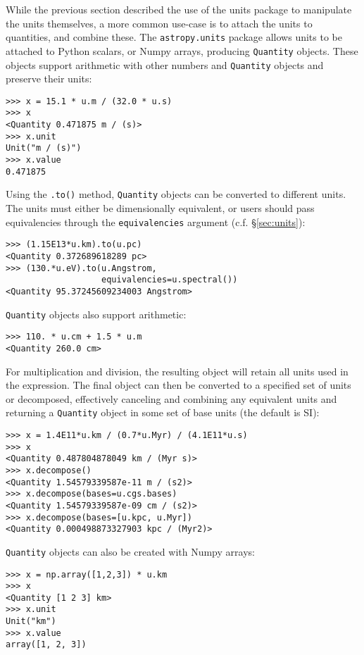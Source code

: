 \documentclass[traditabstract]{aa}
\begin{document}
\label{sec:quantities}

While the previous section described the use of the units package to
manipulate the units themselves, a more common use-case is to attach the units
to quantities, and combine these. The \texttt{astropy.units} package allows
units to be attached to Python scalars, or Numpy arrays, producing
\texttt{Quantity} objects. These objects support arithmetic with other numbers
and \texttt{Quantity} objects and preserve their units:
\begin{verbatim}
>>> x = 15.1 * u.m / (32.0 * u.s)
>>> x
<Quantity 0.471875 m / (s)>
>>> x.unit
Unit("m / (s)")
>>> x.value
0.471875
\end{verbatim}

Using the \texttt{.to()} method, \texttt{Quantity} objects can be
converted to different units. The units must either be dimensionally
equivalent, or users should pass equivalencies through the
\texttt{equivalencies} argument (c.f. \S\ref{sec:units}):
\begin{verbatim}
>>> (1.15E13*u.km).to(u.pc)
<Quantity 0.372689618289 pc>
>>> (130.*u.eV).to(u.Angstrom,
                   equivalencies=u.spectral())
<Quantity 95.37245609234003 Angstrom>
\end{verbatim}

\texttt{Quantity} objects also support arithmetic:
\begin{verbatim}
>>> 110. * u.cm + 1.5 * u.m
<Quantity 260.0 cm>
\end{verbatim}

For multiplication and division, the resulting object will retain all
units used in the expression. The final object can then be converted
to a specified set of units or decomposed, effectively canceling
and combining any equivalent units and returning a \texttt{Quantity}
object in some set of base units (the default is SI):

\begin{verbatim}
>>> x = 1.4E11*u.km / (0.7*u.Myr) / (4.1E11*u.s)
>>> x
<Quantity 0.487804878049 km / (Myr s)>
>>> x.decompose()
<Quantity 1.54579339587e-11 m / (s2)>
>>> x.decompose(bases=u.cgs.bases)
<Quantity 1.54579339587e-09 cm / (s2)>
>>> x.decompose(bases=[u.kpc, u.Myr])
<Quantity 0.000498873327903 kpc / (Myr2)>
\end{verbatim}

\texttt{Quantity} objects can also be created with Numpy
arrays:
\begin{verbatim}
>>> x = np.array([1,2,3]) * u.km
>>> x
<Quantity [1 2 3] km>
>>> x.unit
Unit("km")
>>> x.value
array([1, 2, 3])
\end{verbatim}
\end{document}
